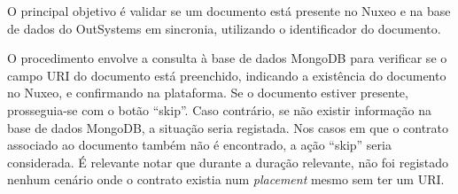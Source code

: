             O principal objetivo é validar se um documento está presente no Nuxeo e na base de dados do OutSystems em sincronia, utilizando o identificador do documento.

            O procedimento envolve a consulta à base de dados MongoDB para verificar se o campo URI do documento está preenchido, indicando a existência do documento no Nuxeo, e confirmando na plataforma. Se o documento estiver presente, prosseguia-se com o botão ``skip''. Caso contrário, se não existir informação na base de dados MongoDB, a situação seria registada. Nos casos em que o contrato associado ao documento também não é encontrado, a ação ``skip'' seria considerada. É relevante notar que durante a duração relevante, não foi registado nenhum cenário onde o contrato existia num \textit{placement} mesmo sem ter um URI.


        

        